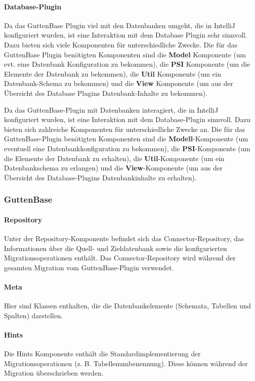 	\paragraph*{Database-Plugin}
	Da das GuttenBase Plugin viel mit den Datenbanken umgeht, die in IntelliJ konfiguriert wurden, ist eine Interaktion mit dem Database Plugin sehr sinnvoll. Dazu bieten sich viele Komponenten für unterschiedliche Zwecke. Die für das GuttenBase Plugin benötigten Komponenten sind die \textbf{Model} Komponente (um evt. eine Datenbank Konfiguration zu bekommen), die \textbf{PSI} Komponente (um die Elemente der Datenbank zu bekommen), die \textbf{Util} Komponente (um ein Datenbank-Schema zu bekommen) und die \textbf{View} Komponente (um aus der Übersicht des Database  Plugins Datenbank-Inhalte zu bekommen).
	
	Da das GuttenBase-Plugin mit Datenbanken interagiert, die in IntelliJ konfiguriert wurden, ist eine Interaktion mit dem Database-Plugin sinnvoll. Dazu bieten sich zahlreiche Komponenten für unterschiedliche Zwecke an. Die für das GuttenBase-Plugin benötigten Komponenten sind die \textbf{Modell}-Komponente (um eventuell eine Datenbankkonfiguration zu bekommen), die \textbf{PSI}-Komponente (um die Elemente der Datenbank zu erhalten), die \textbf{Util}-Komponente (um ein Datenbankschema zu erlangen) und die \textbf{View}-Komponente (um aus der Übersicht des Database-Plugins Datenbankinhalte zu erhalten).
	
	
	\subsubsection{GuttenBase} 
	\paragraph*{Repository}
	Unter der Repository-Komponente befindet sich das Connector-Repository, das Informationen über die Quell- und Zieldatenbank sowie die konfigurierten Migrationsoperationen enthält. Das Connector-Repository wird während der gesamten Migration vom GuttenBase-Plugin verwendet.
	\paragraph*{Meta}
	Hier sind Klassen enthalten, die die Datenbankelemente (Schemata, Tabellen und Spalten) darstellen.
	\paragraph*{Hints}
	Die Hints Komponente enthält die Standardimplementierung der Migrationsoperationen (z. B. Tabellenumbenennung). Diese können während der Migration überschrieben werden.
